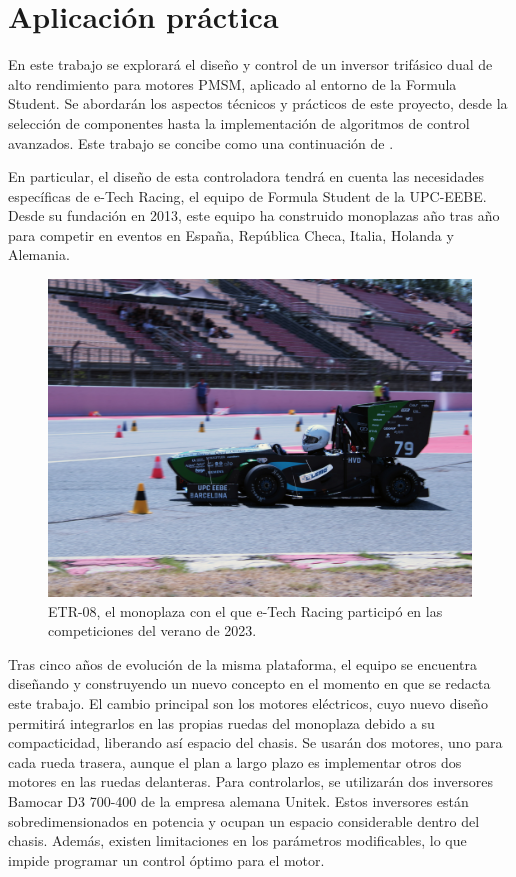 \section{Aplicación práctica}
En este trabajo se explorará el diseño y control de un inversor trifásico dual de alto rendimiento para motores PMSM, aplicado al entorno de la Formula Student. Se abordarán los aspectos técnicos y prácticos de este proyecto, desde la selección de componentes hasta la implementación de algoritmos de control avanzados. Este trabajo se concibe como una continuación de \cite{ArranzClos2018}.

En particular, el diseño de esta controladora tendrá en cuenta las necesidades específicas de e-Tech Racing, el equipo de Formula Student de la UPC-EEBE. Desde su fundación en 2013, este equipo ha construido monoplazas año tras año para competir en eventos en España, República Checa, Italia, Holanda y Alemania.

\begin{figure}[H]
	\centering
	\includegraphics[width=0.7\linewidth]{fig/IMG_1834}
	\caption{ETR-08, el monoplaza con el que e-Tech Racing participó en las competiciones del verano de 2023.}
\end{figure}

Tras cinco años de evolución de la misma plataforma, el equipo se encuentra diseñando y construyendo un nuevo concepto en el momento en que se redacta este trabajo. El cambio principal son los motores eléctricos, cuyo nuevo diseño permitirá integrarlos en las propias ruedas del monoplaza debido a su compacticidad, liberando así espacio del chasis. Se usarán dos motores, uno para cada rueda trasera, aunque el plan a largo plazo es implementar otros dos motores en las ruedas delanteras. Para controlarlos, se utilizarán dos inversores Bamocar D3 700-400 de la empresa alemana Unitek. Estos inversores están sobredimensionados en potencia y ocupan un espacio considerable dentro del chasis. Además, existen limitaciones en los parámetros modificables, lo que impide programar un control óptimo para el motor.

